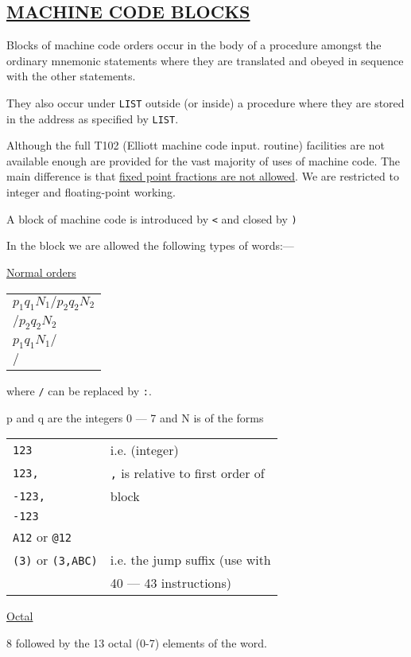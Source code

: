 \documentclass[10pt, a4paper, oneside]{article}
\newcommand{\myuline}[1]{\uline{#1}}
\newcommand{\mytt}[1]{\texttt{\scriptsize #1}}
\newcommand{\mytt}[1]{\texttt{\small #1}}
\begin{document}
\begin{multicols}{2}
\section{\myuline{MACHINE CODE BLOCKS}}

Blocks of machine code orders occur in the body
of a procedure amongst the ordinary mnemonic statements
where they are translated and obeyed in sequence with
the other statements.

They also occur under \mytt{LIST} outside (or inside) a
procedure where they are stored in the address as
specified by \mytt{LIST}.

Although the full T102 (Elliott machine code input.
routine) facilities are not available enough are
provided for the vast majority of uses of machine code.
The main difference is that \myuline{fixed point fractions are
not allowed}.  We are restricted to integer and floating-point working.

A block of machine code is introduced by \mytt{<}
and closed by \mytt{)}

In the block we are allowed the following types
of words:—

\noindent\myuline{Normal orders}

\begin{tabular}{l}
$p_{1}q_{1}N_{1}/p_{2}q_{2}N_{2}$ \\
$/p_{2}q_{2}N_{2}$ \\
$p_{1}q_{1}N_{1}/$ \\
$/$ \\
\end{tabular}

where \mytt{/} can be replaced by \mytt{:}.

p and q are the integers 0 — 7
and N is of the forms

\begin{tabular}{ll}
\mytt{123}   & i.e. (integer) \\
\mytt{123,}  & \mytt{,} is relative to first order of \\
\mytt{-123,} & block \\
\mytt{-123}  & \\
\mytt{A12} or \mytt{@12} & \\
\mytt{(3)} or \mytt{(3,ABC)} & i.e. the jump suffix (use with \\
               & 40 — 43 instructions)
\end{tabular}

\noindent\myuline{Octal}

8 followed by the 13 octal (0-7) elements of the
word.


\end{multicols}
\end{document}
